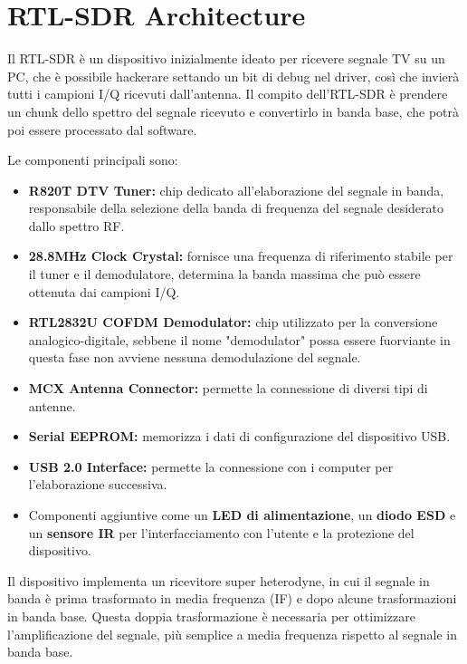 \section*{RTL-SDR Architecture}
Il RTL-SDR è un dispositivo inizialmente ideato per ricevere segnale TV su un PC, che è possibile hackerare settando un bit di debug nel driver, così che invierà tutti i campioni I/Q ricevuti dall'antenna. 
Il compito dell'RTL-SDR è prendere un chunk dello spettro del segnale ricevuto e convertirlo in banda base, che potrà poi essere processato dal software.

Le componenti principali sono:
\begin{itemize}
    \item \textbf{R820T DTV Tuner:} chip dedicato all'elaborazione del segnale in banda, responsabile della selezione della banda di frequenza del segnale desiderato dallo spettro RF.
    \item \textbf{28.8MHz Clock Crystal:} fornisce una frequenza di riferimento stabile per il tuner e il demodulatore, determina la banda massima che può essere ottenuta dai campioni I/Q.
    \item \textbf{RTL2832U COFDM Demodulator:} chip utilizzato per la conversione analogico-digitale, sebbene il nome "demodulator" possa essere fuorviante in questa fase non avviene nessuna demodulazione del segnale.
    \item \textbf{MCX Antenna Connector:} permette la connessione di diversi tipi di antenne.
    \item \textbf{Serial EEPROM:} memorizza i dati di configurazione del dispositivo USB.
    \item \textbf{USB 2.0 Interface:} permette la connessione con i computer per l'elaborazione successiva.
    \item Componenti aggiuntive come un \textbf{LED di alimentazione}, un \textbf{diodo ESD} e un \textbf{sensore IR} per l'interfacciamento con l'utente e la protezione del dispositivo.
\end{itemize}

Il dispositivo implementa un ricevitore super heterodyne, in cui il segnale in banda è prima trasformato in media frequenza (IF) e dopo alcune trasformazioni in banda base.
Questa doppia trasformazione è necessaria per ottimizzare l'amplificazione del segnale, più semplice a media frequenza rispetto al segnale in banda base.

